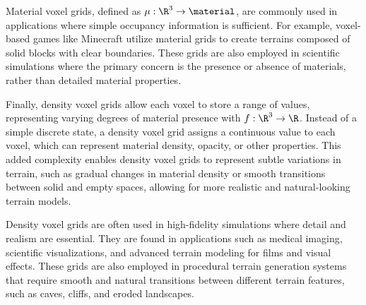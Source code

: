Material voxel grids, defined as $\mu: \R^3 \to \material$, are commonly used in applications where simple occupancy information is sufficient. For example, voxel-based games like Minecraft utilize material grids to create terrains composed of solid blocks with clear boundaries. These grids are also employed in scientific simulations where the primary concern is the presence or absence of materials, rather than detailed material properties.

Finally, density voxel grids allow each voxel to store a range of values, representing varying degrees of material presence with $f: \R^3 \to \R$. Instead of a simple discrete state, a density voxel grid assigns a continuous value to each voxel, which can represent material density, opacity, or other properties. This added complexity enables density voxel grids to represent subtle variations in terrain, such as gradual changes in material density or smooth transitions between solid and empty spaces, allowing for more realistic and natural-looking terrain models.


Density voxel grids are often used in high-fidelity simulations where detail and realism are essential. They are found in applications such as medical imaging, scientific visualizations, and advanced terrain modeling for films and visual effects. These grids are also employed in procedural terrain generation systems that require smooth and natural transitions between different terrain features, such as caves, cliffs, and eroded landscapes.



